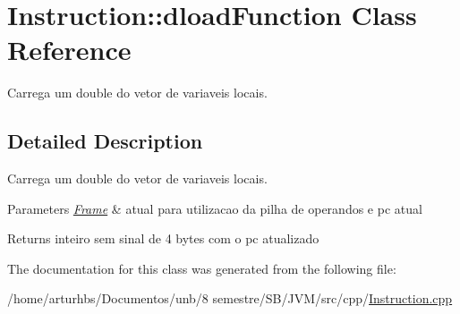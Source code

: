 \hypertarget{classInstruction_1_1dloadFunction}{}\section{Instruction\+:\+:dload\+Function Class Reference}
\label{classInstruction_1_1dloadFunction}


Carrega um double do vetor de variaveis locais.  




\subsection{Detailed Description}
Carrega um double do vetor de variaveis locais. 


\begin{DoxyParams}{Parameters}
{\em \hyperlink{classFrame}{Frame}} & atual para utilizacao da pilha de operandos e pc atual \\
\hline
\end{DoxyParams}
\begin{DoxyReturn}{Returns}
inteiro sem sinal de 4 bytes com o pc atualizado 
\end{DoxyReturn}


The documentation for this class was generated from the following file\+:\begin{DoxyCompactItemize}
\item 
/home/arturhbs/\+Documentos/unb/8 semestre/\+S\+B/\+J\+V\+M/src/cpp/\hyperlink{Instruction_8cpp}{Instruction.\+cpp}\end{DoxyCompactItemize}
